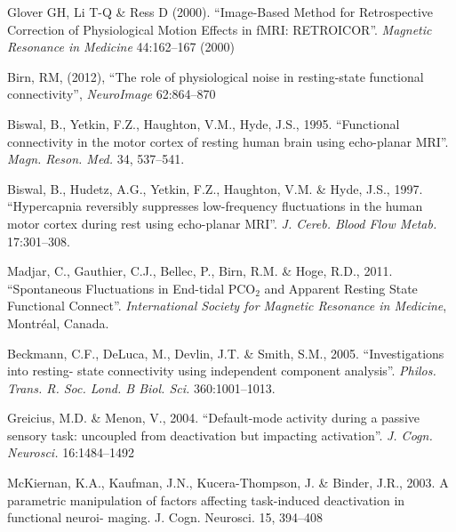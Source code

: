 \documentclass[twoside,twocolumn]{article}
\begin{document}



\begin{thebibliography}{99} %

	 Glover GH, Li T-Q \& Ress D (2000). ``Image-Based Method for Retrospective Correction of Physiological Motion Effects in fMRI: RETROICOR''. {\em Magnetic Resonance in Medicine} 44:162–167 (2000)
	
	 Birn, RM, (2012), ``The role of physiological noise in resting-state functional connectivity'', {\em NeuroImage} 62:864–870
	
	 Biswal, B., Yetkin, F.Z., Haughton, V.M., Hyde, J.S., 1995. ``Functional connectivity in the motor cortex of resting human brain using echo-planar MRI''. {\em Magn. Reson. Med.} 34, 537–541.
	
	 Biswal, B., Hudetz, A.G., Yetkin, F.Z., Haughton, V.M. \& Hyde, J.S., 1997. ``Hypercapnia reversibly suppresses low-frequency ﬂuctuations in the human motor cortex during rest using echo-planar MRI''. {\em J. Cereb. Blood Flow Metab.} 17:301–308.
	
	 Madjar, C., Gauthier, C.J., Bellec, P., Birn, R.M. \& Hoge, R.D., 2011. ``Spontaneous Fluctuations in End-tidal PCO$_2$ and Apparent Resting State Functional Connect''. {\em International Society for Magnetic Resonance in Medicine}, Montr\'eal, Canada.
	
	 Beckmann, C.F., DeLuca, M., Devlin, J.T. \& Smith, S.M., 2005. ``Investigations into resting- state connectivity using independent component analysis''. {\em Philos. Trans. R. Soc. Lond. B Biol. Sci.} 360:1001–1013.
	
	 Greicius, M.D. \& Menon, V., 2004. ``Default-mode activity during a passive sensory task: uncoupled from deactivation but impacting activation''. {\em J. Cogn. Neurosci.} 16:1484–1492
	
	 McKiernan, K.A., Kaufman, J.N., Kucera-Thompson, J. \& Binder, J.R., 2003. A parametric manipulation of factors affecting task-induced deactivation in functional neuroi- maging. J. Cogn. Neurosci. 15, 394–408
	

\end{thebibliography}
\end{document}
